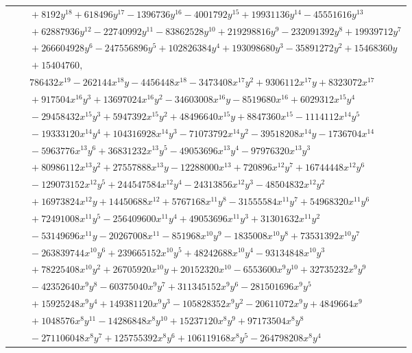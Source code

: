 \documentclass[11pt]{article}
\begin{document}
\begin{longtable}{@{}ll@{}}
 & $\quad +8192y^{18}+618496y^{17}-1396736y^{16}-4001792y^{15}+19931136y^{14}-45551616y^{13}$\\
 & $\quad +62887936y^{12}-22740992y^{11}-83862528y^{10}+219298816y^{9}-232091392y^{8}+19939712y^{7}$\\
 & $\quad +266604928y^{6}-247556896y^{5}+102826384y^{4}+193098680y^{3}-35891272y^{2}+15468360y$\\
 & $\quad +15404760,$\\
 & $\quad 786432x^{19}-262144x^{18}y-4456448x^{18}-3473408x^{17}y^{2}+9306112x^{17}y+8323072x^{17}$\\
 & $\quad +917504x^{16}y^{3}+13697024x^{16}y^{2}-34603008x^{16}y-8519680x^{16}+6029312x^{15}y^{4}$\\
 & $\quad -29458432x^{15}y^{3}+5947392x^{15}y^{2}+48496640x^{15}y+8847360x^{15}-1114112x^{14}y^{5}$\\
 & $\quad -19333120x^{14}y^{4}+104316928x^{14}y^{3}-71073792x^{14}y^{2}-39518208x^{14}y-1736704x^{14}$\\
 & $\quad -5963776x^{13}y^{6}+36831232x^{13}y^{5}-49053696x^{13}y^{4}-97976320x^{13}y^{3}$\\
 & $\quad +80986112x^{13}y^{2}+27557888x^{13}y-12288000x^{13}+720896x^{12}y^{7}+16744448x^{12}y^{6}$\\
 & $\quad -129073152x^{12}y^{5}+244547584x^{12}y^{4}-24313856x^{12}y^{3}-48504832x^{12}y^{2}$\\
 & $\quad +16973824x^{12}y+14450688x^{12}+5767168x^{11}y^{8}-31555584x^{11}y^{7}+54968320x^{11}y^{6}$\\
 & $\quad +72491008x^{11}y^{5}-256409600x^{11}y^{4}+49053696x^{11}y^{3}+31301632x^{11}y^{2}$\\
 & $\quad -53149696x^{11}y-20267008x^{11}-851968x^{10}y^{9}-1835008x^{10}y^{8}+73531392x^{10}y^{7}$\\
 & $\quad -263839744x^{10}y^{6}+239665152x^{10}y^{5}+48242688x^{10}y^{4}-93134848x^{10}y^{3}$\\
 & $\quad +78225408x^{10}y^{2}+26705920x^{10}y+20152320x^{10}-6553600x^{9}y^{10}+32735232x^{9}y^{9}$\\
 & $\quad -42352640x^{9}y^{8}-60375040x^{9}y^{7}+311345152x^{9}y^{6}-281501696x^{9}y^{5}$\\
 & $\quad +15925248x^{9}y^{4}+149381120x^{9}y^{3}-105828352x^{9}y^{2}-20611072x^{9}y+4849664x^{9}$\\
 & $\quad +1048576x^{8}y^{11}-14286848x^{8}y^{10}+15237120x^{8}y^{9}+97173504x^{8}y^{8}$\\
 & $\quad -271106048x^{8}y^{7}+125755392x^{8}y^{6}+106119168x^{8}y^{5}-264798208x^{8}y^{4}$\\

\end{longtable}
\end{document}
